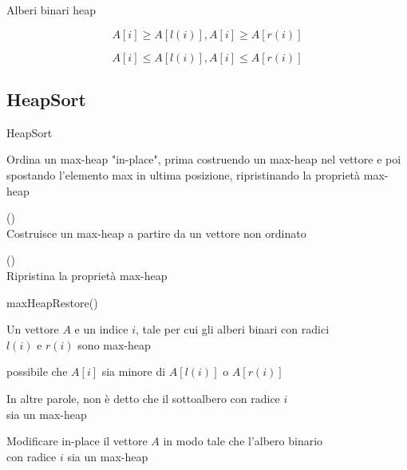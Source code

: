 \begin{frame}{Alberi binari heap}

\vspace{-9pt}
\begin{myboxtitle}
\[
A[i] \geq A[l(i)], A[i] \geq A[r(i)]
\]
\end{myboxtitle}

\begin{myboxtitle}
\[
A[i] \leq A[l(i)], A[i] \leq A[r(i)]
\]
\end{myboxtitle}


\end{frame}

\subsection{HeapSort}

\begin{frame}{HeapSort}

\vspace{-9pt}
\begin{myboxtitle}
Ordina un max-heap "in-place", prima costruendo un max-heap nel vettore e poi spostando l'elemento max in ultima posizione, ripristinando la proprietà max-heap
\BIL
\item \alert{\heapbuild()}\\ Costruisce un max-heap a partire da un vettore non ordinato 
\item \alert{\maxheapify()}\\ Ripristina la proprietà max-heap
\EIL
\end{myboxtitle}


\end{frame}

\begin{frame}{maxHeapRestore()}

\vspace{-9pt}
\begin{myboxtitle}[Input]
Un vettore $A$ e un indice $i$, tale per cui gli alberi binari
con radici\\ $l(i)$ e $r(i)$ sono max-heap
\end{myboxtitle}

\begin{myboxtitle}[Osservazione]
\BI
\item \EE possibile che $A[i]$ sia minore di $A[l(i)]$ o $A[r(i)]$
\item In altre parole, non è detto che il sottoalbero con radice $i$\\ sia
un max-heap
\EI
\end{myboxtitle}

\begin{myboxtitle}[Goal]
Modificare in-place il vettore $A$ in modo tale che l'albero binario\\ con radice $i$
sia un max-heap
\end{myboxtitle}    
    
\end{frame}

